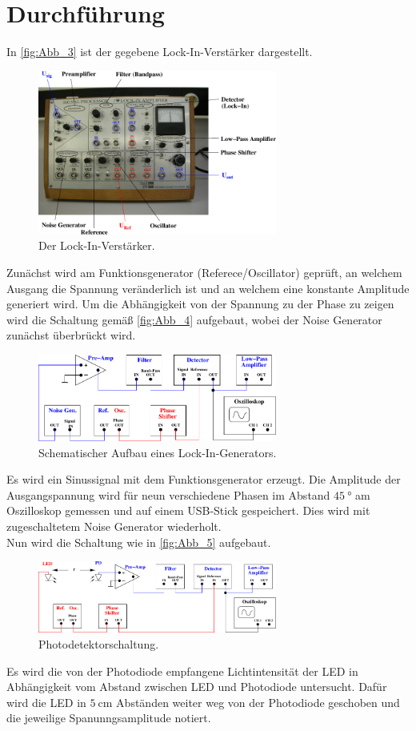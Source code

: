 \section{Durchführung}
\label{sec:Durchführung}

In \autoref{fig:Abb_3} ist der gegebene Lock-In-Verstärker dargestellt.
\begin{figure}[H]
    \centering
    \includegraphics[width=0.7\textwidth]{build/Abb_3.pdf}
    \caption {Der Lock-In-Verstärker.\cite{V303}}
    \label{fig:Abb_3}
\end{figure}
Zunächst wird am Funktionsgenerator (Referece/Oscillator) geprüft, an welchem Ausgang die Spannung veränderlich ist und an welchem eine konstante Amplitude generiert wird.
Um die Abhängigkeit von der Spannung zu der Phase zu zeigen wird die Schaltung gemäß \autoref{fig:Abb_4} aufgebaut, wobei der Noise Generator zunächst überbrückt wird.
\begin{figure}[H]
    \centering
    \includegraphics[width=0.7\textwidth]{build/Abb_4.pdf}
    \caption {Schematischer Aufbau eines Lock-In-Generators.\cite{V303}}
    \label{fig:Abb_4}
\end{figure}
Es wird ein Sinussignal mit dem Funktionsgenerator erzeugt.
Die Amplitude der Ausgangspannung wird für neun verschiedene Phasen im Abstand $\qty{45}{\degree}$ am Oszilloskop gemessen und auf einem USB-Stick gespeichert.
Dies wird mit zugeschaltetem Noise Generator wiederholt.\\
Nun wird die Schaltung wie in \autoref{fig:Abb_5} aufgebaut.
\begin{figure}[H]
    \centering
    \includegraphics[width=0.7\textwidth]{build/Abb_5.pdf}
    \caption {Photodetektorschaltung.\cite{V303}}
    \label{fig:Abb_5}
\end{figure}
Es wird die von der Photodiode empfangene Lichtintensität der LED in Abhängigkeit vom Abstand zwischen LED und Photodiode untersucht.
Dafür wird die LED in $\qty{5}{\centi\meter}$ Abständen weiter weg von der Photodiode geschoben und die jeweilige Spanunngsamplitude notiert.

